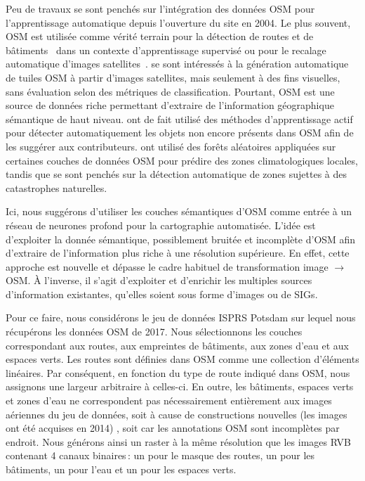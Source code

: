 Peu de travaux se sont penchés sur l'intégration des données \gls{OSM} pour l'apprentissage automatique depuis l'ouverture du site en 2004. Le plus souvent, \gls{OSM} est utilisée comme vérité terrain pour la détection de routes et de bâtiments~\cite{mnih_machine_2013,maggiori_learning_2017} dans un contexte d'apprentissage supervisé ou pour le recalage automatique d'images satellites~\cite{vakalopoulou_simultaneous_2016}. \citet{isola_image--image_2016} se sont intéressés à la génération automatique de tuiles \gls{OSM} à partir d'images satellites, mais seulement à des fins visuelles, sans évaluation selon des métriques de classification. Pourtant, \gls{OSM} est une source de données riche permettant d'extraire de l'information géographique sémantique de haut niveau.
\citet{chen_deepvgi_2017} ont de fait utilisé des méthodes d'apprentissage actif pour détecter automatiquement les objets non encore présents dans \gls{OSM} afin de les suggérer aux contributeurs. \citet{danylo_contributing_2016} ont utilisé des forêts aléatoires appliquées sur certaines couches de données \gls{OSM} pour prédire des zones climatologiques locales, tandis que \citet{geis_joint_2017} se sont penchés sur la détection automatique de zones sujettes à des catastrophes naturelles.

Ici, nous suggérons d'utiliser les couches sémantiques d'\gls{OSM} comme entrée à un réseau de neurones profond pour la cartographie automatisée. L'idée est d'exploiter la donnée sémantique, possiblement bruitée et incomplète d'\gls{OSM} afin d'extraire de l'information plus riche à une résolution supérieure. En effet, cette approche est nouvelle et dépasse le cadre habituel de transformation image $\rightarrow$ \gls{OSM}. À l'inverse, il s'agit d'exploiter et d'enrichir les multiples sources d'information existantes, qu'elles soient sous forme d'images ou de \glspl{SIG}.

Pour ce faire, nous considérons le jeu de données \gls{ISPRS} Potsdam sur lequel nous récupérons les données \gls{OSM} de 2017. Nous sélectionnons les couches correspondant aux routes, aux empreintes de bâtiments, aux zones d'eau et aux espaces verts. Les routes sont définies dans \gls{OSM} comme une collection d'éléments linéaires. Par conséquent, en fonction du type de route indiqué dans \gls{OSM}, nous assignons une largeur arbitraire à celles-ci. En outre, les bâtiments, espaces verts et zones d'eau ne correspondent pas nécessairement entièrement aux images aériennes du jeu de données, soit à cause de constructions nouvelles (les images ont été acquises en 2014) , soit car les annotations \gls{OSM} sont incomplètes par endroit. Nous générons ainsi un raster à la même résolution que les images \gls{RVB} contenant 4 canaux binaires\,: un pour le masque des routes, un pour les bâtiments, un pour l'eau et un pour les espaces verts.

